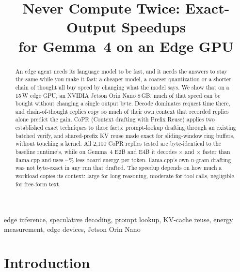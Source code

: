 \documentclass[conference]{IEEEtran}
\newcommand{\sys}{CoPR}
\newcommand{\lc}{llama.cpp}
\begin{document}
\title{Never Compute Twice: Exact-Output Speedups\\for Gemma~4 on an Edge GPU}

\author{
}

\maketitle

\begin{abstract}
An edge agent needs its language model to be fast, and it needs the answers to
stay the same while you make it fast: a cheaper model, a coarser quantization
or a shorter chain of thought all buy speed by changing what the model says. We
show that on a 15\,W edge GPU, an NVIDIA Jetson Orin Nano 8\,GB, much of that
speed can be bought without changing a single output byte. Decode dominates
request time there, and chain-of-thought replies copy so much of their own
context that recorded replies alone predict the gain. \sys{} (Context drafting
with Prefix Reuse) applies two established exact techniques to these facts:
prompt-lookup drafting through an existing batched verify, and shared-prefix KV
reuse made exact for sliding-window ring buffers, without touching a kernel.
All 2{,}100 \sys{} replies tested are byte-identical to the baseline runtime's,
while on Gemma~4 E2B and E4B it decodes \EtwoSpL$\times$ and \EfourSpL$\times$
faster than \lc{} and uses \EtwoJsav--\EfourJsav\,\% less board energy per token.
\lc{}'s own $n$-gram drafting was not byte-exact in any run that drafted. The
speedup depends on how much a workload copies its context: large for long
reasoning, moderate for tool calls, negligible for free-form text.
\end{abstract}

\begin{IEEEkeywords}
edge inference, speculative decoding, prompt lookup, KV-cache reuse, energy measurement, edge devices, Jetson Orin Nano
\end{IEEEkeywords}

\section{Introduction}
\end{document}
